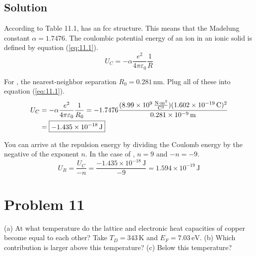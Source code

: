 \documentclass[12pt]{article}
\newcommand{\E}[1]{\times 10^{#1}}
\begin{document}
    \subsection{Solution}
        According to Table 11.1,  has an fcc structure.
        This means that the Madelung constant $\alpha = 1.7476$. 
        The coulombic potential energy of an ion in an ionic solid is defined by equation (\ref{eq:11.1}).
        \begin{equation}
            \label{eq:11.1} \tag{11.1}
            U_C = -\alpha \frac{e^2}{4\pi\varepsilon_0} \frac{1}{R}
        \end{equation}

        For , the nearest-neighbor separation $R_0 = 0.281\,\unit{\nano\meter}$.
        Plug all of these into equation (\ref{eq:11.1}).
        \begin{align}
            U_C &=  -\alpha \frac{e^2}{4\pi\varepsilon_0} \frac{1}{R_0}
                =   -1.7476 \frac{(8.99\E{9}\,\unit{\frac{\newton\cdot\meter^2}{\coulomb^2}})(1.602\E{-19}\,\unit{\coulomb})^2}{0.281\E{-9}\,\unit{\meter}}\\
                &=  \boxed{-1.435\E{-18}\,\unit{\joule}}
        \end{align}

        You can arrive at the repulsion energy by dividing the Coulomb energy by the negative of the exponent $n$.
        In the case of , $n = 9$ and $-n = -9$.
        \begin{equation}
            U_R =   \frac{U_C}{-n}
                =   \frac{-1.435\E{-18}\,\unit{\joule}}{-9}
                =   \boxed{1.594\E{-19}\,\unit{\joule}}
        \end{equation}

    \pagebreak

\section{Problem 11}
    (a) At what temperature do the lattice and electronic heat capacities of copper become equal to each other? 
    Take $T_D = 343\,\unit{\kelvin}$ and $E_F = 7.03\,\unit{\eV}$. 
    (b) Which contribution is larger above this temperature? 
    (c) Below this temperature?
\end{document}
